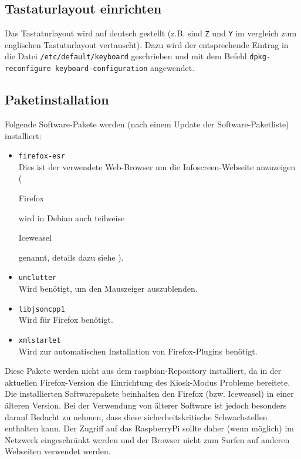 \subsection{Tastaturlayout einrichten}
\label{sec:tastatur}
Das Tastaturlayout wird auf deutsch gestellt (z.B. sind \lstinline|Z| und \lstinline|Y| im vergleich zum englischen Tastaturlayout vertauscht).
Dazu wird der entsprechende Eintrag in die Datei \lstinline|/etc/default/keyboard| geschrieben und mit dem Befehl \lstinline|dpkg-reconfigure keyboard-configuration| angewendet.

\subsection{Paketinstallation}
\label{sec:paketinstallation}
Folgende Software-Pakete werden (nach einem Update der Software-Paketliste) installiert:
\begin{itemize}
	\item {\lstinline|firefox-esr|\\Dies ist der verwendete Web-Browser um die Infoscreen-Webseite anzuzeigen (\begin{em}Firefox\end{em} wird in Debian auch teilweise \begin{em}Iceweasel\end{em} genannt, details dazu siehe \cite{iceweasel}).}
	\item {\lstinline|unclutter|\\Wird benötigt, um den Mauszeiger auszublenden.}
	\item {\lstinline|libjsoncpp1|\\Wird für Firefox benötigt.}
	\item {\lstinline|xmlstarlet|\\Wird zur automatischen Installation von Firefox-Plugins benötigt.}
\end{itemize}

Diese Pakete werden nicht aus dem raspbian-Repository installiert, da in der aktuellen Firefox-Version die Einrichtung des Kiosk-Modus Probleme bereitete.
Die installierten Softwarepakete beinhalten den Firefox (bzw. Iceweasel) in einer älteren Version. 
Bei der Verwendung von älterer Software ist jedoch besonders darauf Bedacht zu nehmen, dass diese sicherheitskritische Schwachstellen enthalten kann.
Der Zugriff auf das RaspberryPi sollte daher (wenn möglich) im Netzwerk eingeschränkt werden und der Browser nicht zum Surfen auf anderen Webseiten verwendet werden.

